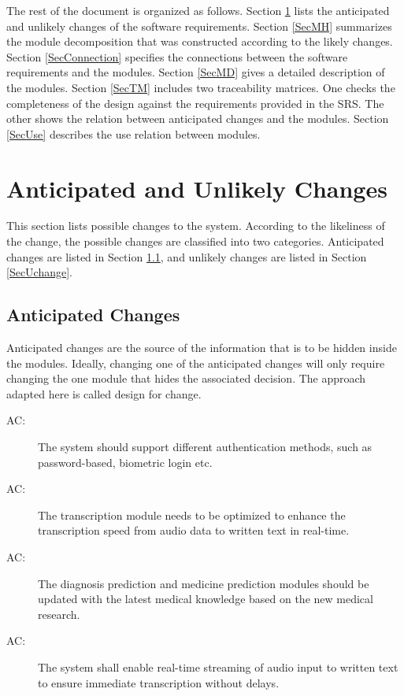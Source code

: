 \documentclass[12pt, titlepage]{article}
\newcounter{acnum}
\newcommand{\actheacnum}{AC\theacnum}
\begin{document}
The rest of the document is organized as follows. Section
\ref{SecChange} lists the anticipated and unlikely changes of the software
requirements. Section \ref{SecMH} summarizes the module decomposition that
was constructed according to the likely changes. Section \ref{SecConnection}
specifies the connections between the software requirements and the
modules. Section \ref{SecMD} gives a detailed description of the
modules. Section \ref{SecTM} includes two traceability matrices. One checks
the completeness of the design against the requirements provided in the SRS. The
other shows the relation between anticipated changes and the modules. Section
\ref{SecUse} describes the use relation between modules.

\section{Anticipated and Unlikely Changes} \label{SecChange}

This section lists possible changes to the system. According to the likeliness
of the change, the possible changes are classified into two
categories. Anticipated changes are listed in Section \ref{SecAchange}, and
unlikely changes are listed in Section \ref{SecUchange}.

\subsection{Anticipated Changes} \label{SecAchange}

Anticipated changes are the source of the information that is to be hidden
inside the modules. Ideally, changing one of the anticipated changes will only
require changing the one module that hides the associated decision. The approach
adapted here is called design for change.

\begin{description}
\item[ \actheacnum \label{acLogin}:] The system should support different authentication methods, such as password-based, biometric login etc.
\item[ \actheacnum \label{acTransSpeed}:] The transcription module needs to be optimized to enhance the transcription speed from audio data to written text in real-time. 
\item[ \actheacnum \label{acPredModules}:] The diagnosis prediction and medicine prediction modules should be updated with the latest medical knowledge based on the new medical research.
\item[ \actheacnum \label{acRealTime}:] The system shall enable real-time streaming of audio input to written text to ensure immediate transcription without delays.   
\end{description}
\end{document}
